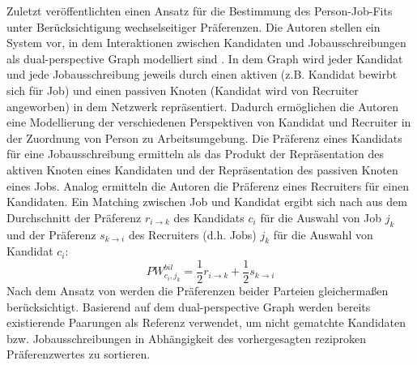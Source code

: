Zuletzt veröffentlichten \textcite[S. 102ff.]{yang:inproceedings} einen Ansatz für die Bestimmung des Person-Job-Fits unter Berücksichtigung wechselseitiger Präferenzen.
Die Autoren stellen ein System vor, in dem Interaktionen zwischen Kandidaten und Jobausschreibungen als dual-perspective Graph modelliert sind \cite[S. 102]{yang:inproceedings}.
In dem Graph wird jeder Kandidat und jede Jobausschreibung jeweils durch einen aktiven (z.B. Kandidat bewirbt sich für Job) und einen passiven Knoten (Kandidat wird von Recruiter angeworben) in dem Netzwerk repräsentiert.
Dadurch ermöglichen die Autoren eine Modellierung der verschiedenen Perspektiven von Kandidat und Recruiter in der Zuordnung von Person zu Arbeitsumgebung.
Die Präferenz eines Kandidats für eine Jobausschreibung ermitteln \textcite[S. 106]{yang:inproceedings} als das Produkt der Repräsentation des aktiven Knoten eines Kandidaten und der Repräsentation des passiven Knoten eines Jobs.
Analog ermitteln die Autoren die Präferenz eines Recruiters für einen Kandidaten.
Ein Matching zwischen Job und Kandidat ergibt sich nach \textcite[S. 106]{yang:inproceedings} aus dem Durchschnitt der Präferenz $r_{i\rightarrow k}$ des Kandidats $c_{i}$ für die Auswahl von Job $j_{k}$ und der Präferenz $s_{k\rightarrow i}$ des Recruiters (d.h. Jobs) $j_{k}$ für die Auswahl von Kandidat $c_{i}$:
\begin{equation}\label{eq38}
    PW_{c_{i},j_{k}}^{bil} = \frac{1}{2} r_{i\rightarrow k} +\frac{1}{2} s_{k\rightarrow i}
\end{equation}
Nach dem Ansatz von \textcite[S. 102ff.]{yang:inproceedings} werden die Präferenzen beider Parteien gleichermaßen berücksichtigt.
Basierend auf dem dual-perspec\-tive Graph werden bereits existierende Paarungen als Referenz verwendet, um nicht gematchte Kandidaten bzw. Jobausschreibungen in Abhängigkeit des vorhergesagten reziproken Präferenzwertes zu sortieren.

